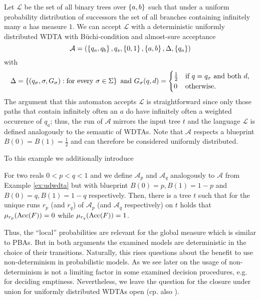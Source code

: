 \begin{example}
  \cite[Example 7]{RandAutoInfTrees}
  Let $\mathcal{L}$ be the set of all binary trees over $\left\{a,b\right\}$ such that
  under a uniform probability distribution of successors the set of all 
  branches containing infinitely many $a$ has measure $1$. We can accept 
  $\mathcal{L}$ with a deterministic uniformly distributed \ac{WDTA} with 
  Büchi-condition and almost-sure acceptance
  \begin{equation*}
    \mathcal{A} = \left(\left\{q_{a}, q_{b}\right\}, q_{s}, \left\{0,1\right\}, \left\{a,b\right\}, 
    \Delta, \left\{q_{a}\right\}\right)
  \end{equation*}
  with
  \begin{equation*}
    \Delta = \left\{
      \left(q_{\sigma}, \sigma, G_{\sigma}\right):
        \text{for every }\sigma\in\Sigma
    \right\}
    \text{ and } G_{\sigma}(q, d) = \begin{cases}
      \frac{1}{2}&\text{if }q = q_{\sigma}\text{ and both }d,\\
      0&\text{otherwise}.
    \end{cases}
  \end{equation*}
  The argument that this automaton accepts $\mathcal{L}$ is straightforward 
  since only those paths that contain infinitely often an $a$ do have 
  infinitely often a weighted occurence of $q_{a}$; thus, the run of 
  $\mathcal{A}$ mirrors the input tree $t$ and the language $\mathcal{L}$ is
  defined analogously to the semantic of \acp{WDTA}. Note that $\mathcal{A}$
  respects a blueprint $B(0) = B(1) = \frac{1}{2}$ and can therefore be 
  considered uniformly distributed.
  \label{ex:udwdta}
\end{example}
To this example we additionally introduce
\begin{proposition}
  \cite[Proposition 11]{RandAutoInfTrees}
  For two reals $0 < p < q < 1$ and we define $\mathcal{A}_{p}$ and 
  $\mathcal{A}_{q}$ analogously to $\mathcal{A}$ from Example \ref{ex:udwdta}
  but with blueprint $B(0) = p, B(1) = 1-p$ and $B(0) = q, B(1) = 1-q$ 
  respectively. Then, there is a tree $t$ such that for the unique runs $r_{p}$
  (and $r_{q}$) of $\mathcal{A}_{p}$ (and $\mathcal{A}_{q}$ respectively) on 
  $t$ holds that $\mu_{r_{p}}(\operatorname{Acc}(F)) = 0$ while $\mu_{r_{q}}(\operatorname{Acc}(F)) = 1$.
\end{proposition}
Thus, the \enquote{local} probabilities are relevant for the global measure
which is similar to \acp{PBA}. But in both arguments the examined models are
deterministic in the choice of their transitions. Naturally, this rises 
questions about the benefit to use non-determinism in probabilistic models. As 
we see later on the usage of non-determinism is not a limiting factor in some 
examined decision procedures, e.g. for deciding emptiness. Nevertheless, we 
leave the question for the closure under union for uniformly distributed
\acp{WDTA} open (cp. also \cite[Remark 12]{RandAutoInfTrees}).

